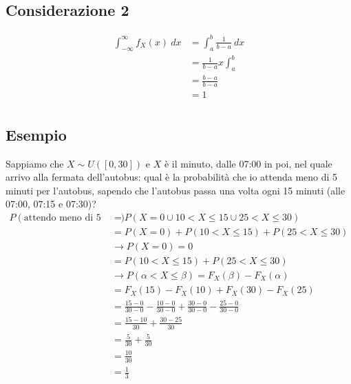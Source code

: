 \documentclass[11pt]{report}
\begin{document}
\subsection{Considerazione 2}
\begin{equation}
    \begin{split}
        \int_{-\infty}^\infty f_X(x)\ dx & = \int_a^b \frac{1}{b-a}\ dx\\
        & = \frac{1}{b-a} x \int_a^b\\
        & = \frac{b-a}{b-a}\\
        & = 1\\
    \end{split}
\end{equation}
\subsection{Esempio}
Sappiamo che $X \sim U([0,30])$ e $X$ è il minuto, dalle 07:00 in poi, nel quale arrivo alla fermata dell'autobus: qual è la probabilità che io attenda meno di 5 minuti per l'autobus, sapendo che l'autobus passa una volta ogni 15 minuti (alle 07:00, 07:15 e 07:30)?
\begin{equation}
    \begin{split}
        P(\text{attendo meno di 5 minuti}) & = P(X=0 \cup 10 < X \leq 15 \cup 25 < X \leq 30)\\
        & = P(X=0) + P(10 < X \leq 15) + P(25 < X \leq 30)\\
        & \rightarrow P(X=0) = 0\\
        & = P(10 < X \leq 15) + P(25 < X \leq 30)\\
        & \rightarrow P(\alpha < X \leq \beta) = F_X(\beta) - F_X(\alpha)\\
        & = F_X(15) - F_X(10) + F_X(30) - F_X(25)\\
        & = \frac{15-0}{30-0} - \frac{10-0}{30-0} + \frac{30-0}{30-0} - \frac{25-0}{30-0}\\
        & = \frac{15-10}{30} + \frac{30-25}{30}\\
        & = \frac{5}{30} + \frac{5}{30}\\
        & = \frac{10}{30}\\
        & = \frac{1}{3}
    \end{split}
\end{equation}
\end{document}
